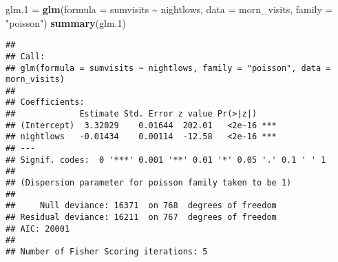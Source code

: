 \documentclass[
]{article}
\newenvironment{Shaded}{\begin{snugshade}}{\end{snugshade}}
\newcommand{\AttributeTok}[1]{\textcolor[rgb]{0.13,0.29,0.53}{#1}}
\newcommand{\CommentTok}[1]{\textcolor[rgb]{0.56,0.35,0.01}{\textit{#1}}}
\newcommand{\DecValTok}[1]{\textcolor[rgb]{0.00,0.00,0.81}{#1}}
\newcommand{\FloatTok}[1]{\textcolor[rgb]{0.00,0.00,0.81}{#1}}
\newcommand{\FunctionTok}[1]{\textcolor[rgb]{0.13,0.29,0.53}{\textbf{#1}}}
\newcommand{\NormalTok}[1]{#1}
\newcommand{\OtherTok}[1]{\textcolor[rgb]{0.56,0.35,0.01}{#1}}
\newcommand{\SpecialCharTok}[1]{\textcolor[rgb]{0.81,0.36,0.00}{\textbf{#1}}}
\newcommand{\StringTok}[1]{\textcolor[rgb]{0.31,0.60,0.02}{#1}}
\begin{document}
\begin{Shaded}
\begin{Highlighting}[]
\NormalTok{glm}\FloatTok{.1} \OtherTok{=} \FunctionTok{glm}\NormalTok{(}\AttributeTok{formula =}\NormalTok{ sumvisits }\SpecialCharTok{\textasciitilde{}}\NormalTok{ nightlows, }\AttributeTok{data =}\NormalTok{ morn\_visits, }\AttributeTok{family =} \StringTok{"poisson"}\NormalTok{)}
\FunctionTok{summary}\NormalTok{(glm}\FloatTok{.1}\NormalTok{)}
\end{Highlighting}
\end{Shaded}

\begin{verbatim}
## 
## Call:
## glm(formula = sumvisits ~ nightlows, family = "poisson", data = morn_visits)
## 
## Coefficients:
##             Estimate Std. Error z value Pr(>|z|)    
## (Intercept)  3.32029    0.01644  202.01   <2e-16 ***
## nightlows   -0.01434    0.00114  -12.58   <2e-16 ***
## ---
## Signif. codes:  0 '***' 0.001 '**' 0.01 '*' 0.05 '.' 0.1 ' ' 1
## 
## (Dispersion parameter for poisson family taken to be 1)
## 
##     Null deviance: 16371  on 768  degrees of freedom
## Residual deviance: 16211  on 767  degrees of freedom
## AIC: 20001
## 
## Number of Fisher Scoring iterations: 5
\end{verbatim}

\begin{Shaded}
\end{Shaded}
\end{document}
